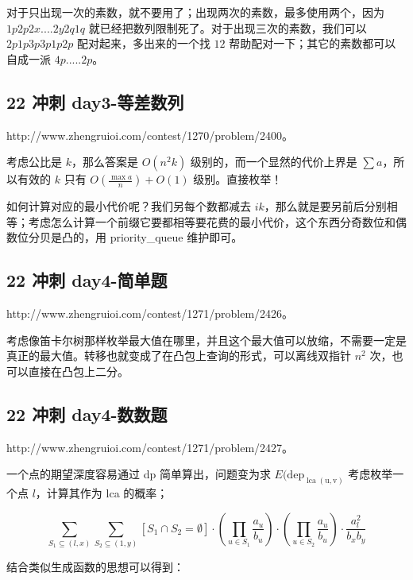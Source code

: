 \documentclass[UTF8,12pt,a4paper]{ctexart}
\begin{document}
	对于只出现一次的素数，就不要用了；出现两次的素数，最多使用两个，因为 $1p 2p 2x .... 2y 2q 1q$ 就已经把数列限制死了。对于出现三次的素数，我们可以 $2p 1p 3p 3p 1p 2p$ 配对起来，多出来的一个找 $12$ 帮助配对一下；其它的素数都可以自成一派 $4p ..... 2p$。
	
	\subsection*{22 冲刺 day3-等差数列}
	
	http://www.zhengruioi.com/contest/1270/problem/2400。
	
	考虑公比是 $k$，那么答案是 $O(n^2k)$ 级别的，而一个显然的代价上界是 $\sum a$，所以有效的 $k$ 只有 $O(\frac{\max a}{n})+O(1)$ 级别。直接枚举！
	
	如何计算对应的最小代价呢？我们另每个数都减去 $ik$，那么就是要另前后分别相等；考虑怎么计算一个前缀它要都相等要花费的最小代价，这个东西分奇数位和偶数位分贝是凸的，用 priority\_queue 维护即可。
	
	\subsection*{22 冲刺 day4-简单题}
	
	http://www.zhengruioi.com/contest/1271/problem/2426。
	
	考虑像笛卡尔树那样枚举最大值在哪里，并且这个最大值可以放缩，不需要一定是真正的最大值。转移也就变成了在凸包上查询的形式，可以离线双指针 $n^2$ 次，也可以直接在凸包上二分。
	
	\subsection*{22 冲刺 day4-数数题}
	
	http://www.zhengruioi.com/contest/1271/problem/2427。
	
	一个点的期望深度容易通过 dp 简单算出，问题变为求 $E(\mathrm{dep_{\operatorname{lca}(u,v)}}$
	考虑枚举一个点 $l$，计算其作为 lca 的概率；
	
	$$
	\sum_{S_1\subseteq (l,x)}\sum_{S_2\subseteq (1,y)} [S_1\cap S_2=\emptyset]\cdot \left(\prod_{u\in S_1} \frac {a_u}{b_u}\right)\cdot \left(\prod_{u\in S_2} \frac {a_u}{b_u}\right)\cdot\frac {a_l^2}{b_xb_y}
	$$
	
	结合类似生成函数的思想可以得到：
	
\end{document}
